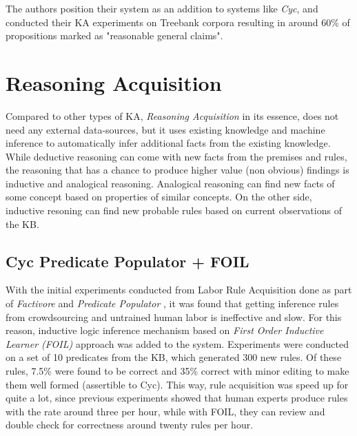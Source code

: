 The authors position their system as an addition to systems like \emph{Cyc}, and
conducted their KA experiments on Treebank corpora resulting in around 60\% of
propositions marked as "reasonable general claims"\parencite{Schubert2003}. 

\section{Reasoning Acquisition}
\label{section:r:reasoningacq}
Compared to other types of KA, \emph{Reasoning Acquisition} in its essence,
does not need any external data-sources, but it uses existing knowledge and
machine inference to automatically infer additional facts from the existing
knowledge. While deductive reasoning can come with new facts from the premises 
and rules, the reasoning that has a chance to produce higher value (non obvious)
findings is inductive and analogical reasoning. Analogical reasoning can find
new facts of some concept based on properties of similar concepts. On the other
side, inductive resoning can find new probable rules based on current 
observations of the KB.

\subsection {Cyc Predicate Populator + FOIL}
With the initial experiments conducted from Labor Rule Acquisition done as part
of \emph{Factivore} and \emph{Predicate Populator} \parencite{Witbrock2005}, it 
was found that getting inference rules from crowdsourcing and untrained
human labor is ineffective and slow. For this reason, inductive logic 
inference mechanism based on \emph{First Order Inductive Learner (FOIL)}
approach
\parencite{Quinlan1995} was added to the system. Experiments were conducted on
a set of 10 predicates from the KB, which generated 300 new rules. Of these
rules, 7.5\% were found to be correct and 35\% correct with minor editing to
make them well formed (assertible to Cyc). This way, rule acquisition was speed
up for quite a lot, since previous experiments showed that human experts produce
rules with the rate around three per hour, while with FOIL, they can review
and double check for correctness around twenty rules per hour.

